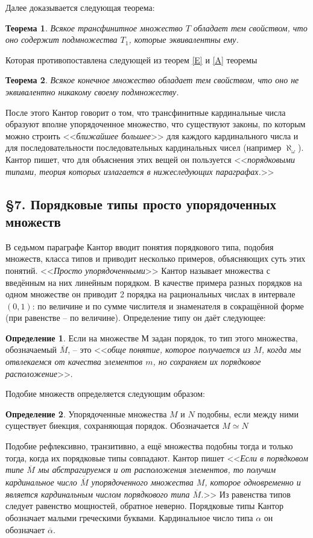 \documentclass[a4paper,12pt]{extarticle}
\newtheorem{theorem}{Теорема}[subsection]
\theoremstyle{definition}
\newtheorem{definition}{Определение}
\newcommand{\cit}[1]{<<\textit{#1}>>}
\newcommand{\car}[1]{\overline{\overline{#1}}}
\begin{document}
Далее доказывается следующая теорема:
\begin{theorem}
    Всякое трансфинитное множество $T$ обладает тем свойством, что оно содержит подмножества $T_1$, которые эквивалентны ему.
\end{theorem}
Которая противопоставлена следующей из теорем \ref{E} и \ref{A} теоремы
\begin{theorem}
    Всякое конечное множество обладает тем свойством, что оно не эквивалентно никакому своему подмножеству.
\end{theorem}

После этого Кантор говорит о том, что трансфинитные кардинальные числа образуют вполне упорядоченное множество,
что существуют законы, по которым можно строить \cit{ближайшее большее} для каждого кардинального числа и
для последовательности последовательных кардинальных чисел (например $\aleph_{\omega}$).
Кантор пишет, что для объяснения этих вещей он пользуется \cit{порядковыми типами,
теория которых излагается в нижеследующих параграфах.}

\subsection{\S 7. Порядковые типы просто упорядоченных множеств}
В седьмом параграфе Кантор вводит понятия порядкового типа, подобия множеств, класса типов и приводит несколько примеров, объясняющих суть этих понятий.
\cit{Просто упорядоченными} Кантор называет множества с введённым на них линейным порядком.
В качестве примера разных порядков на одном множестве он приводит 2 порядка на рациональных числах в интервале $(0, 1)$:
по величине и по сумме числителя и знаменателя в сокращённой форме (при равенстве -- по величине).
Определение типу он даёт следующее:
\begin{definition}
    Если на множестве $М$ задан порядок, то тип этого множества, обозначаемый $\overline{M}$, -- это 
    \cit{обще понятие, которое получается из $M$, когда мы отвлекаемся от качества элементов $m$, но сохраняем их порядковое расположение}.
\end{definition}
Подобие множеств определяется следующим образом:
\begin{definition}
    Упорядоченные множества $M$ и $N$ подобны, если между ними существует биекция, сохраняющая порядок. Обозначается $M \simeq N$
\end{definition}
Подобие рефлексивно, транзитивно, а ещё множества подобны тогда и только тогда, когда их порядковые типы совпадают.
Кантор пишет \cit{Если в порядковом типе $\overline{M}$ мы абстрагируемся и от расположения элементов,
то получим кардинальное число $\car{M}$ упорядоченного множества $M$, которое одновременно и является кардинальным числом порядкового типа $\overline{M}$.}
Из равенства типов следует равенство мощностей, обратное неверно.
Порядковые типы Кантор обозначает малыми греческими буквами.
Кардинальное число типа $\alpha$ он обозначает $\overline{\alpha}$.
\end{document}
